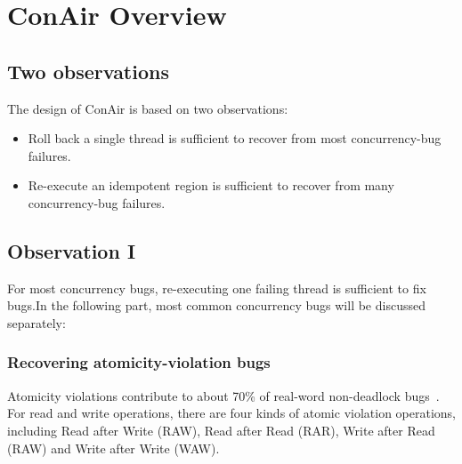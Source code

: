 \section{ConAir Overview}
\label{chp:Overview}
\subsection {Two observations}
The design of ConAir is based on two observations:
\begin{itemize}
\item
Roll back a single thread is sufficient to recover from most concurrency-bug failures.
\item
Re-execute an idempotent region is sufficient to recover from many concurrency-bug failures.
\end{itemize}
\subsection{Observation I}
For most concurrency bugs, re-executing one failing thread is sufficient to fix bugs.In the following part, most common concurrency bugs will be discussed separately:\\
\subsubsection{Recovering atomicity-violation bugs}
Atomicity violations contribute to about 70\% of real-word non-deadlock
bugs~\cite{lu2008learning}. For read and write operations, there are four kinds of atomic violation operations, including Read after Write (RAW), Read after Read (RAR), Write after Read (RAW) and Write after Write (WAW).

